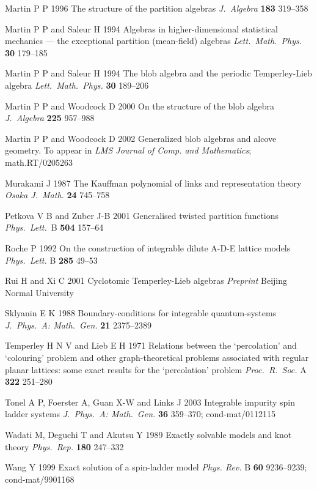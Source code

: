 \documentclass[12pt]{iopart}
\begin{document}
Martin P P 1996
The structure of the partition algebras
{\it J.\ Algebra}\/ {\bf 183} 319--358

Martin P P and Saleur H 1994
Algebras in higher-dimensional statistical mechanics --- 
the exceptional partition (mean-field) algebras
{\it Lett.\ Math.\ Phys.}\/ {\bf 30} 179--185

Martin P P and Saleur H 1994
The blob algebra and the periodic Temperley-Lieb algebra
{\it Lett.\ Math.\ Phys.}\/ {\bf 30} 189--206

Martin P P and Woodcock D 2000
On the structure of the blob algebra
{\it J.\ Algebra}\/ {\bf 225} 957--988

Martin P P and Woodcock D 2002
Generalized blob algebras and alcove geometry.
To appear in {\it LMS Journal of Comp. and Mathematics};
math.RT/0205263

Murakami J 1987
The Kauffman polynomial of links and representation theory
{\it Osaka J.\ Math.}\/ {\bf 24} 745--758

Petkova V B and Zuber J-B 2001
Generalised twisted partition functions
{\it Phys.\ Lett.}\ B {\bf 504} 157--64 

Roche P 1992
On the construction of integrable dilute A-D-E lattice models
{\it Phys.\ Lett.}\/ B {\bf 285} 49--53

Rui H and Xi C 2001
Cyclotomic Temperley-Lieb algebras
{\it Preprint} Beijing Normal University

Sklyanin E K 1988
Boundary-conditions for integrable quantum-systems
{\it J.\ Phys.\ A: Math.\ Gen.}\/ {\bf 21} 2375--2389

Temperley H N V and Lieb E H 1971
Relations between the `percolation' and `colouring' problem and other 
graph-theoretical problems associated with regular planar lattices:
some exact results for the `percolation' problem
{\it Proc.\ R.\ Soc.}\/ A {\bf 322} 251--280

Tonel A P, Foerster A, Guan X-W and Links J 2003 
Integrable impurity spin ladder systems
{\it J.\ Phys.\ A: Math.\ Gen.}\/ {\bf 36} 359--370;
cond-mat/0112115

Wadati M, Deguchi T and Akutsu Y 1989
Exactly solvable models and knot theory
{\it Phys.\ Rep.}\/ {\bf 180} 247--332

Wang Y 1999 
Exact solution of a spin-ladder model
{\it Phys. Rev.}\/ B {\bf 60} 9236--9239;
cond-mat/9901168
\end{document}
